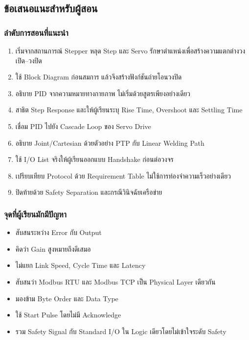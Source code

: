 \subsection{ข้อเสนอแนะสำหรับผู้สอน}

\subsubsection{ลำดับการสอนที่แนะนำ}

\begin{enumerate}
    \item เริ่มจากสถานการณ์ Stepper หลุด Step และ Servo รักษาตำแหน่งเพื่อสร้างความแตกต่างวงเปิด–วงปิด
    \item ใช้ Block Diagram ก่อนสมการ แล้วจึงสร้างฟังก์ชันถ่ายโอนวงปิด
    \item อธิบาย PID จากความหมายทางกายภาพ ไม่เริ่มด้วยสูตรเพียงอย่างเดียว
    \item สาธิต Step Response และให้ผู้เรียนระบุ Rise Time, Overshoot และ Settling Time
    \item เชื่อม PID ไปยัง Cascade Loop ของ Servo Drive
    \item อธิบาย Joint/Cartesian ด้วยตัวอย่าง PTP กับ Linear Welding Path
    \item ใช้ I/O List จริงให้ผู้เรียนออกแบบ Handshake ก่อนต่อวงจร
    \item เปรียบเทียบ Protocol ด้วย Requirement Table ไม่ใช้การท่องจำความเร็วอย่างเดียว
    \item ปิดท้ายด้วย Safety Separation และกรณีวินิจฉัยเครือข่าย
\end{enumerate}

\subsubsection{จุดที่ผู้เรียนมักมีปัญหา}

\begin{itemize}
    \item สับสนระหว่าง Error กับ Output
    \item คิดว่า Gain สูงหมายถึงดีเสมอ
    \item ไม่แยก Link Speed, Cycle Time และ Latency
    \item สับสนว่า Modbus RTU และ Modbus TCP เป็น Physical Layer เดียวกัน
    \item มองข้าม Byte Order และ Data Type
    \item ใช้ Start Pulse โดยไม่มี Acknowledge
    \item รวม Safety Signal กับ Standard I/O ใน Logic เดียวโดยไม่เข้าใจระดับ Safety
\end{itemize}

